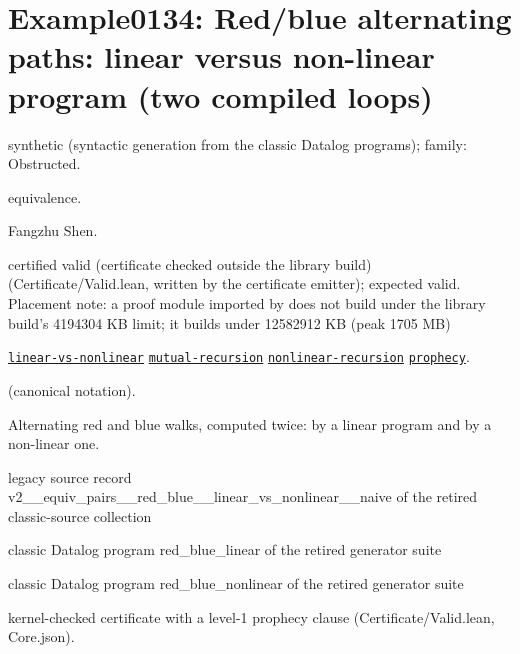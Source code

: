 \documentclass[10pt]{article}
\begin{document}
\Needspace{0.45\textheight}

\section{Example0134: Red/blue alternating paths: linear versus non-linear program (two compiled loops)}\label{case:Example0134}

\begin{description}[leftmargin=2.6cm,style=nextline,itemsep=1pt]

\item[Category] synthetic (syntactic generation from the classic Datalog programs); family: Obstructed.

\item[Kind] equivalence.

\item[Contributors] Fangzhu Shen.

\item[Status] certified valid (certificate checked outside the library build) (Certificate/Valid.lean, written by the certificate emitter); expected valid. Placement note: a proof module imported by  does not build under the library build's 4194304 KB limit; it builds under 12582912 KB (peak 1705 MB)

\item[Tags] \hyperref[tag:linear-vs-nonlinear]{\texttt{linear-vs-nonlinear}} \hyperref[tag:mutual-recursion]{\texttt{mutual-recursion}} \hyperref[tag:nonlinear-recursion]{\texttt{nonlinear-recursion}} \hyperref[tag:prophecy]{\texttt{prophecy}}.

\item[Input]  (canonical notation).

\item[Summary] Alternating red and blue walks, computed twice: by a linear program and by a non-linear one.

\item[Sources] {\raggedright legacy source record v2\_\_equiv\_pairs\_\_red\_blue\_\_linear\_vs\_nonlinear\_\_naive of the retired classic-source collection \par classic Datalog program red\_blue\_linear of the retired generator suite \par classic Datalog program red\_blue\_nonlinear of the retired generator suite\par}

\item[Prophecy] kernel-checked certificate with a level-1 prophecy clause (Certificate/Valid.lean, Core.json).

\end{description}
\end{document}
